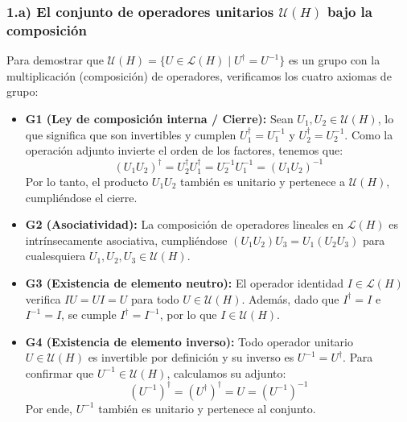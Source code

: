 \documentclass[11pt, a4paper]{article}
\begin{document}
\subsubsection*{1.a) El conjunto de operadores unitarios $\mathcal{U}(H)$ bajo la composición}
Para demostrar que $\mathcal{U}(H) = \{U \in \mathcal{L}(H) \mid U^\dagger = U^{-1}\}$ es un grupo con la multiplicación (composición) de operadores, verificamos los cuatro axiomas de grupo:
\begin{itemize}
    \item \textbf{G1 (Ley de composición interna / Cierre):} Sean $U_1, U_2 \in \mathcal{U}(H)$, lo que significa que son invertibles y cumplen $U_1^\dagger = U_1^{-1}$ y $U_2^\dagger = U_2^{-1}$. Como la operación adjunto invierte el orden de los factores, tenemos que:
    \[
    (U_1 U_2)^\dagger = U_2^\dagger U_1^\dagger = U_2^{-1} U_1^{-1} = (U_1 U_2)^{-1}
    \]
    Por lo tanto, el producto $U_1 U_2$ también es unitario y pertenece a $\mathcal{U}(H)$, cumpliéndose el cierre.
    \item \textbf{G2 (Asociatividad):} La composición de operadores lineales en $\mathcal{L}(H)$ es intrínsecamente asociativa, cumpliéndose $(U_1 U_2) U_3 = U_1 (U_2 U_3)$ para cualesquiera $U_1, U_2, U_3 \in \mathcal{U}(H)$.
    \item \textbf{G3 (Existencia de elemento neutro):} El operador identidad $I \in \mathcal{L}(H)$ verifica $I U = U I = U$ para todo $U \in \mathcal{U}(H)$. Además, dado que $I^\dagger = I$ e $I^{-1} = I$, se cumple $I^\dagger = I^{-1}$, por lo que $I \in \mathcal{U}(H)$.
    \item \textbf{G4 (Existencia de elemento inverso):} Todo operador unitario $U \in \mathcal{U}(H)$ es invertible por definición y su inverso es $U^{-1} = U^\dagger$. Para confirmar que $U^{-1} \in \mathcal{U}(H)$, calculamos su adjunto:
    \[
    (U^{-1})^\dagger = (U^\dagger)^\dagger = U = (U^{-1})^{-1}
    \]
    Por ende, $U^{-1}$ también es unitario y pertenece al conjunto.
\end{itemize}
\end{document}

